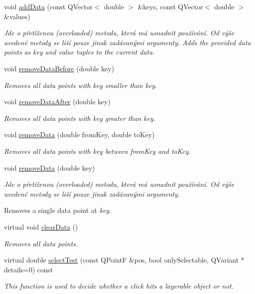 \begin{DoxyCompactItemize}
void \hyperlink{classQCPBars_a3679a0a9decab0fa03f8f4c6e3344d52}{add\+Data} (const Q\+Vector$<$ double $>$ \&keys, const Q\+Vector$<$ double $>$ \&values)
\begin{DoxyCompactList}\small\item\em Jde o přetíženou (overloaded) metodu, která má usnadnit používání. Od výše uvedené metody se liší pouze jinak zadávanými argumenty. Adds the provided data points as {\itshape key} and {\itshape value} tuples to the current data. \end{DoxyCompactList}\item 
void \hyperlink{classQCPBars_a9d12779a3fad4820aad2c428f368298d}{remove\+Data\+Before} (double key)
\begin{DoxyCompactList}\small\item\em Removes all data points with key smaller than {\itshape key}. \end{DoxyCompactList}\item 
void \hyperlink{classQCPBars_a99de6e7abbbf03fb41fa604c7f08aa8b}{remove\+Data\+After} (double key)
\begin{DoxyCompactList}\small\item\em Removes all data points with key greater than {\itshape key}. \end{DoxyCompactList}\item 
void \hyperlink{classQCPBars_a1fe9bcb57d670defea1bb65cadf43765}{remove\+Data} (double from\+Key, double to\+Key)
\begin{DoxyCompactList}\small\item\em Removes all data points with key between {\itshape from\+Key} and {\itshape to\+Key}. \end{DoxyCompactList}\item 
void \hyperlink{classQCPBars_a837cc9848ad3edd40a6130b508493f93}{remove\+Data} (double key)
\begin{DoxyCompactList}\small\item\em Jde o přetíženou (overloaded) metodu, která má usnadnit používání. Od výše uvedené metody se liší pouze jinak zadávanými argumenty.

Removes a single data point at {\itshape key}. \end{DoxyCompactList}\item 
virtual void \hyperlink{classQCPBars_a11dbbd707132f07f862dff13c5789c2b}{clear\+Data} ()
\begin{DoxyCompactList}\small\item\em Removes all data points. \end{DoxyCompactList}\item 
virtual double \hyperlink{classQCPBars_a0d37a9feb1d0baf73ce6e809db214445}{select\+Test} (const Q\+Point\+F \&pos, bool only\+Selectable, Q\+Variant $\ast$details=0) const 
\begin{DoxyCompactList}\small\item\em This function is used to decide whether a click hits a layerable object or not. \end{DoxyCompactList}\end{DoxyCompactItemize}
